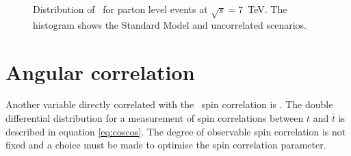 \begin{figure}[htpb!]
\begin{center}
\end{center}
\caption{Distribution of \dphi\ for parton level events at $\sqrt{s}=7$~TeV. The histogram shows the Standard Model and uncorrelated scenarios. }
\label{fig:parton_dphi}
\end{figure} 

\section{Angular correlation}
\label{sec:coscos}
Another variable directly correlated with the \ttbar\ spin correlation is \coscos. 
The double differential distribution for a measurement of  
spin correlations between $t$ and $\bar{t}$ is described in equation \ref{eq:coscos}. The degree of observable spin correlation is not fixed and a choice must be made to optimise the spin correlation parameter.
%
%

